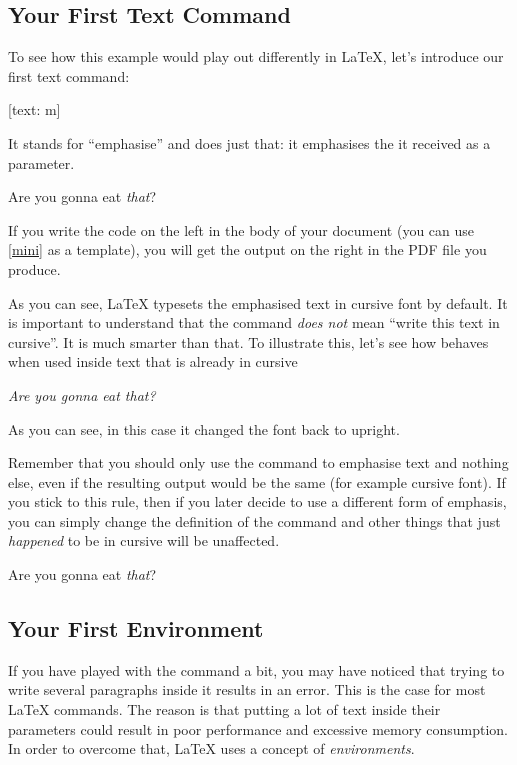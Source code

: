 \subsection{Your First Text Command}

To see how this example would play out differently in \LaTeX{}, let's introduce
our first text command:
\begin{lscommand}
  [text: m]
\end{lscommand}
It stands for \enquote{emphasise} and does just that: it emphasises the
 it received as a parameter.
\begin{example}
Are you gonna eat \emph{that}?
\end{example}
If you write the code on the left in the body of your document (you can use
\autoref{mini} as a template), you will get the output on the right in the
PDF file you produce.

As you can see, \LaTeX{} typesets the emphasised text in cursive font by
default. It is important to understand that the  command
\emph{does not} mean \enquote{write this text in cursive}. It is much smarter
than that. To illustrate this, let's see how  behaves when used inside
text that is already in cursive
\begin{example}
  \itshape%
Are you gonna eat \emph{that}?
\end{example}
As you can see, in this case it changed the font back to upright.

Remember that you should only use the  command to emphasise text and
nothing else, even if the resulting output would be the same (for example
cursive font). If you stick to this rule, then if you later decide to use a
different form of emphasis, you can simply change the definition of the
 command and other things that just \emph{happened} to be in cursive
will be unaffected.
\begin{example}
  \RenewCommandCopy{\emph}{\strong}%
Are you gonna eat \emph{that}?
\end{example}

\subsection{Your First Environment}

If you have played with the  command a bit, you may have noticed that
trying to write several paragraphs inside it results in an error. This is the
case for most \LaTeX{} commands. The reason is that putting a lot of
text inside their parameters could result in poor performance and excessive
memory consumption. In order to overcome that, \LaTeX{} uses a concept of
\emph{environments}.

